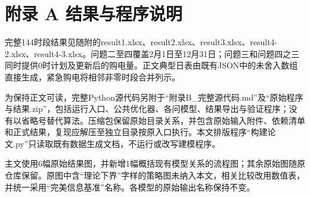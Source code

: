 \documentclass[UTF8,a4paper,zihao=-4,fontset=windows]{ctexart}
\begin{document}
\section{附录 A 结果与程序说明}
完整144时段结果见随附的result1.xlsx、result2.xlsx、result3.xlsx、result4-2.xlsx、result4-3.xlsx。问题二至四覆盖2月1日至12月31日；问题三和问题四之三同时提供0时计划及更新后的购电量。正文典型日表由既有JSON中的未舍入数组直接生成，紧急购电将相邻非零时段合并列示。
\par
为保持正文可读，完整Python源代码另附于“附录B\_完整源代码.md”及“原始程序与结果.zip”，包括运行入口、公共优化器、各问模型、结果导出与验证程序；没有以省略号替代算法。压缩包保留原始目录关系，并包含原始输入附件、依赖清单和正式结果，复现应解压至独立目录按原入口执行。本文排版程序“构建论文.py”只读取既有数据生成文档，不运行或改写建模程序。
\par
主文使用6幅原始结果图，并新增1幅概括现有模型关系的流程图；其余原始图随原仓库保留。原图中含“理论下界”字样的策略图未纳入本文，相关比较改用数值表，并统一采用“完美信息基准”名称。各模型的原始输出名称保持不变。
\par
\end{document}

